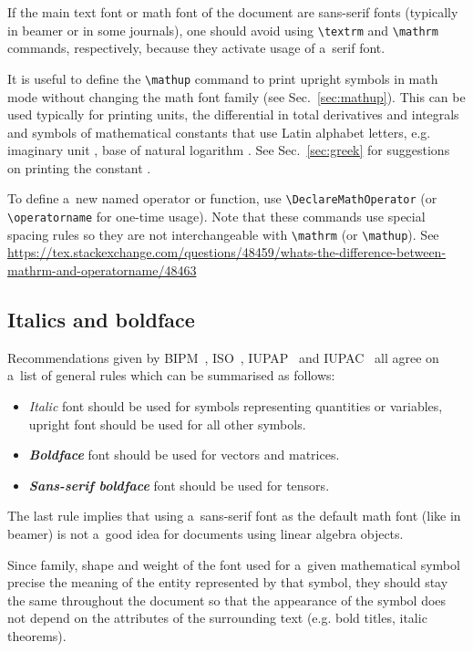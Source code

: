 \documentclass[12pt,a4paper]{article}
\begin{document}
If the main text font or math font of the document are sans-serif fonts (typically in beamer or in some journals), one should avoid using \verb_\textrm_ and \verb_\mathrm_ commands, respectively, because they activate usage of a~serif font.

It is useful to define the \verb_\mathup_ command to print upright symbols in math mode without changing the math font family (see Sec.~\ref{sec:mathup}).
This can be used typically for printing units, the differential  in total derivatives and integrals and symbols of mathematical constants that use Latin alphabet letters, e.g. imaginary unit , base of natural logarithm .
See Sec.~\ref{sec:greek} for suggestions on printing the constant \ml{\pic}.


To define a~new named operator or function, use \verb_\DeclareMathOperator_ (or \verb_\operatorname_ for one-time usage).
Note that these commands use special spacing rules so they are not interchangeable with \verb_\mathrm_ (or \verb_\mathup_).
See \url{https://tex.stackexchange.com/questions/48459/whats-the-difference-between-mathrm-and-operatorname/48463}

\subsection{Italics and boldface}

Recommendations given by BIPM~\cite{bipm-si-brochure}, ISO~\cite{iso-80000-1,iso-80000-2}, IUPAP~\cite{iupap-red-book} and IUPAC~\cite{iupac-green-book} all agree on a~list of general rules which can be summarised as follows:

\begin{itemize}
\item \textit{Italic} font should be used for symbols representing quantities or variables, upright font should be used for all other symbols.
\item \textbf{\textit{Boldface}} font should be used for vectors and matrices.
\item \textsf{\textbf{\textit{Sans-serif boldface}}} font should be used for tensors.
\end{itemize}

The last rule implies that using a~sans-serif font as the default math font (like in beamer) is not a~good idea for documents using linear algebra objects.

Since family, shape and weight of the font used for a~given mathematical symbol precise the meaning of the entity represented by that symbol, they should stay the same throughout the document so that the appearance of the symbol does not depend on the attributes of the surrounding text (e.g. bold titles, italic theorems).
\end{document}
